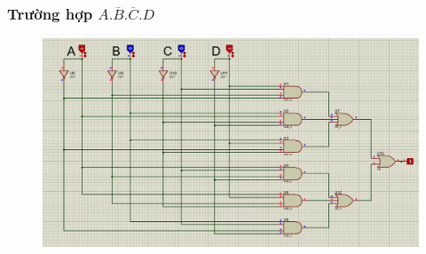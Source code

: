\subsubsection{Trường hợp $A.\overline{B}.\overline{C}.D$}
\begin{figure}[H]
    \centering
    \includegraphics[width=\textwidth]{pictures/b2.5.png}
\end{figure}
\cleardoublepage